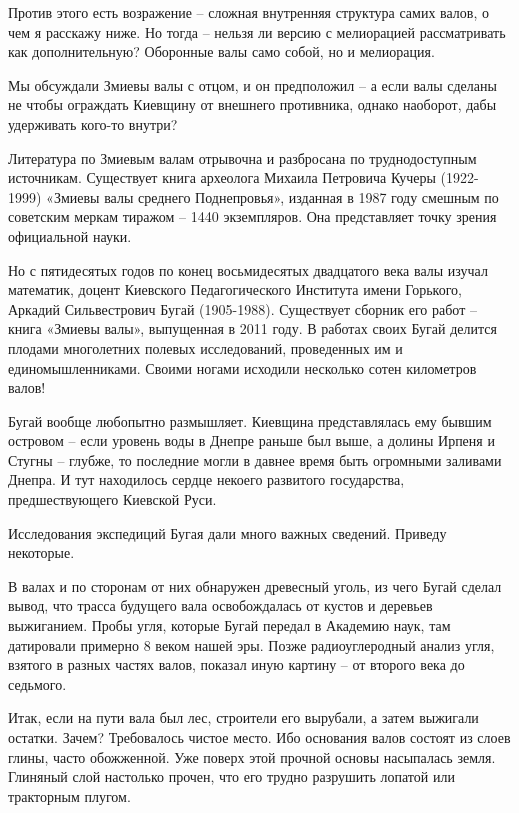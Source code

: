Против этого есть возражение – сложная внутренняя структура самих валов, о чем я расскажу ниже. Но тогда – нельзя ли версию с мелиорацией рассматривать как дополнительную? Оборонные валы само собой, но и мелиорация.

Мы обсуждали Змиевы валы с отцом, и он предположил – а если валы сделаны не чтобы ограждать Киевщину от внешнего противника, однако наоборот, дабы удерживать кого-то внутри?

Литература по Змиевым валам отрывочна и разбросана по труднодоступным источникам. Существует книга археолога Михаила Петровича Кучеры (1922-1999) «Змиевы валы среднего Поднепровья», изданная в 1987 году смешным по советским меркам тиражом – 1440 экземпляров. Она представляет точку зрения официальной науки.

Но с пятидесятых годов по конец восьмидесятых двадцатого века валы изучал математик, доцент Киевского Педагогического Института имени Горького, Аркадий Сильвестрович Бугай (1905-1988). Существует сборник его работ – книга «Змиевы валы», выпущенная в 2011 году. В работах своих Бугай делится плодами многолетних полевых исследований, проведенных им и единомышленниками. Своими ногами исходили несколько сотен километров валов!


Бугай вообще любопытно размышляет. Киевщина представлялась ему бывшим островом – если уровень воды в Днепре раньше был выше, а долины Ирпеня и Стугны – глубже, то последние могли в давнее время быть огромными заливами Днепра. И тут находилось сердце некоего развитого государства, предшествующего Киевской Руси.

Исследования экспедиций Бугая дали много важных сведений. Приведу некоторые.

В валах и по сторонам от них обнаружен древесный уголь, из чего Бугай сделал вывод, что трасса будущего вала освобождалась от кустов и деревьев выжиганием. Пробы угля, которые Бугай передал в Академию наук, там датировали примерно 8 веком нашей эры. Позже радиоуглеродный анализ угля, взятого в разных частях валов, показал иную картину – от второго века до седьмого.

Итак, если на пути вала был лес, строители его вырубали, а затем выжигали остатки. Зачем? Требовалось чистое место. Ибо основания валов состоят из слоев глины, часто обожженной. Уже поверх этой прочной основы насыпалась земля. Глиняный слой настолько прочен, что его трудно разрушить лопатой или тракторным плугом.

